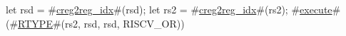 let rsd = #\hyperref[sailRISCVzcreg2regzyidx]{creg2reg\_idx}#(rsd);
let rs2 = #\hyperref[sailRISCVzcreg2regzyidx]{creg2reg\_idx}#(rs2);
#\hyperref[sailRISCVzexecute]{execute}#(#\hyperref[sailRISCVzRTYPE]{RTYPE}#(rs2, rsd, rsd, RISCV_OR))
